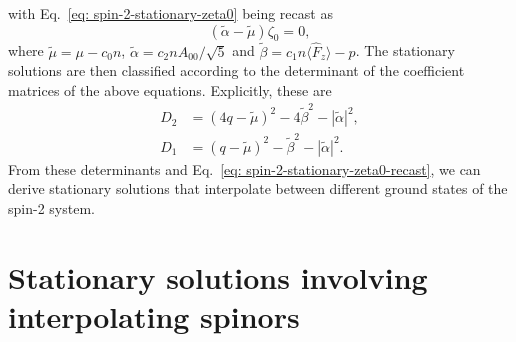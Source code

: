 with Eq.~\eqref{eq: spin-2-stationary-zeta0} being recast as
\begin{equation}\label{eq: spin-2-stationary-zeta0-recast}
    (\tilde{\alpha} - \tilde{\mu})\zeta_0 = 0,
\end{equation}
where \(\tilde{\mu} = \mu - c_0n\), \(\tilde{\alpha} = c_2nA_{00}/\sqrt{5}\) and
\(\tilde{\beta} = c_1n\langle\hat{F}_z\rangle - p\).
The stationary solutions are then classified according to the determinant of
the coefficient matrices of the above equations.
Explicitly, these are
\begin{align}
    D_2 & = {(4q-\tilde{\mu})}^2 -4\tilde{\beta}^2 - |\tilde{\alpha}|^2,
    \label{eq: D2}                                                        \\
    D_1 & = {(q - \tilde{\mu})}^2 - \tilde{\beta}^2 - |\tilde{\alpha}|^2.
    \label{eq: D1}
\end{align}
From these determinants and Eq.~\eqref{eq: spin-2-stationary-zeta0-recast},
we can derive stationary solutions that interpolate between different ground
states of the spin-2 system.

\section{Stationary solutions involving interpolating spinors}
